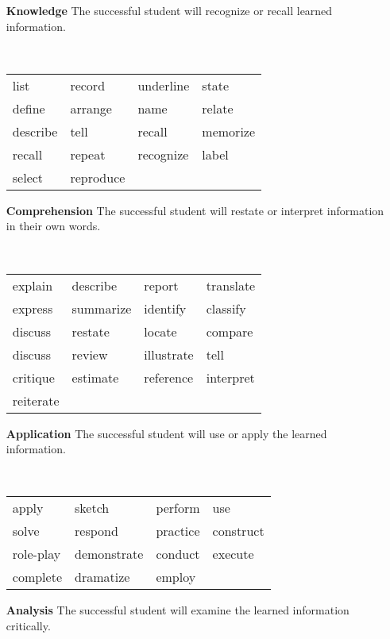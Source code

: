 \documentclass{book}
\begin{document}
\begin{enumerate}
	\item[\bfseries Knowledge] The successful student will recognize or recall learned information.

		\vspace{.1cm}
		~\begin{tabularx}{.7\textwidth}{|XXXX|}
			\hline
			list & record & underline & state\\
			define & arrange & name & relate\\
			describe & tell & recall & memorize\\
			recall & repeat & recognize & label\\
			select & reproduce &&\\\hline
		\end{tabularx}
		\vspace{.1cm}
	\item[\bfseries Comprehension] The successful student will restate or interpret information in their own words.

		\vspace{.1cm}
		~\begin{tabularx}{.7\textwidth}{|XXXX|}
			\hline
explain & describe & report & translate\\
express & summarize & identify & classify\\
discuss & restate & locate & compare\\
discuss & review & illustrate & tell\\
critique & estimate & reference & interpret\\
			reiterate&&&\\\hline
		\end{tabularx}
		\vspace{.1cm}
	\item[\bfseries Application] The successful student will use or apply the learned information.

		\vspace{.1cm}
		~\begin{tabularx}{.7\textwidth}{|XXXX|}
			\hline
apply & sketch & perform & use\\
solve & respond & practice & construct\\
role-play & demonstrate & conduct & execute\\
			complete & dramatize & employ&\\\hline
		\end{tabularx}
		\vspace{.1cm}
	\item[\bfseries Analysis] The successful student will examine the learned information critically.


\end{enumerate}
\end{document}
